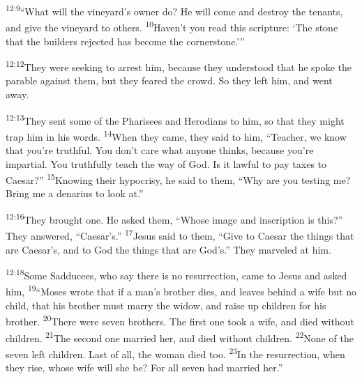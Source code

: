 \documentclass[openany,12pt,english]{book}
\newenvironment{para}{\par\pretolerance=100\tolerance=200\setlength{\emergencystretch}{0.6em}\relax}{\par}
\begin{document}
\begin{para}
    \textsuperscript{12:9}\thinspace{}“What will the vineyard's own\-er do? He will come and de\-stroy the tenants, and give the vine\-yard to others.
    \textsuperscript{10}\thinspace{}Have\-n't you read this scrip\-ture: ‘The stone that the builders rejected has be\-come the cor\-ner\-stone.’”
\end{para}

\begin{para}
    \textsuperscript{12:12}\thinspace{}They were seek\-ing to ar\-rest him, be\-cause they un\-der\-stood that he spoke the par\-a\-ble against them, but they feared the crowd. So they left him, and went a\-way.
\end{para}

\bigskip{}

\begin{para}
    \textsuperscript{12:13}\thinspace{}They sent some of the Pharisees and Herodians to him, so that they might trap him in his words.
    \textsuperscript{14}\thinspace{}When they came, they said to him, “Teach\-er, we know that you're truth\-ful. You don't care what any\-one thinks, be\-cause you're im\-par\-tial. You truthfully teach the way of God. Is it law\-ful to pay taxes to Caesar?”
    \textsuperscript{15}\thinspace{}Know\-ing their hy\-poc\-ri\-sy, he said to them, “Why are you testing me? Bring me a de\-nar\-i\-us to look at.”
\end{para}

\begin{para}
    \textsuperscript{12:16}\thinspace{}They brought one. He asked them, “Whose im\-age and in\-scrip\-tion is this?” They answered, “Caesar's.”
    \textsuperscript{17}\thinspace{}Jesus said to them, “Give to Caesar the things that are Caesar's, and to God the things that are God's.” They mar\-veled at him.
\end{para}

\bigskip{}

\begin{para}
    \textsuperscript{12:18}\thinspace{}Some Sadducees, who say there is no res\-ur\-rec\-tion, came to Jesus and asked him,
    \textsuperscript{19}\thinspace{}“Mo\-ses wrote that if a man's broth\-er dies, and leaves be\-hind a wife but no child, that his broth\-er must mar\-ry the wid\-ow, and raise up chil\-dren for his broth\-er.
    \textsuperscript{20}\thinspace{}There were sev\-en brothers. The first one took a wife, and died with\-out chil\-dren.
    \textsuperscript{21}\thinspace{}The second one mar\-ried her, and died with\-out chil\-dren.
    \textsuperscript{22}\thinspace{}None of the sev\-en left chil\-dren. Last of all, the wom\-an died too.
    \textsuperscript{23}\thinspace{}In the res\-ur\-rec\-tion, when they rise, whose wife will she be? For all sev\-en had mar\-ried her.”
\end{para}
\end{document}
